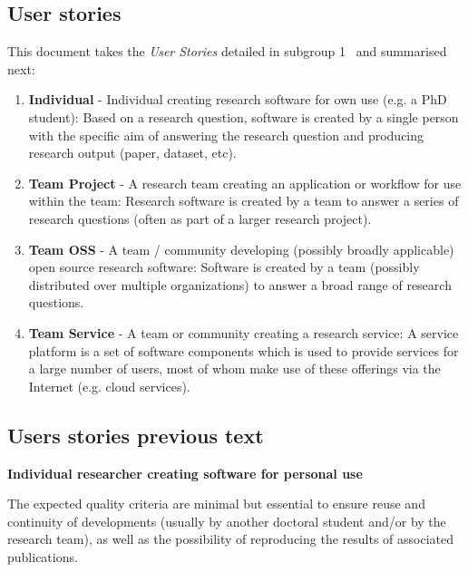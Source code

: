 \subsection{User stories}
\label{subsec:user_stories}

This document takes the \textit{User Stories} detailed in subgroup 1~\cite{sg1tf2023} and summarised next:

\begin{enumerate}
    \item \textbf{Individual} - Individual creating research software for own use (e.g. a PhD student): Based on a research question, software is created by a single person with the specific aim of answering the research question and producing research output (paper, dataset, etc).
    \item \textbf{Team Project} - A research team creating an application or workflow for use within the team: Research software is created by a team to answer a series of research questions (often as part of a larger research project).
    \item \textbf{Team OSS} - A team / community developing (possibly broadly applicable) open source research software: Software is created by a team (possibly distributed over multiple organizations) to answer a broad range of research questions.
    \item \textbf{Team Service} - A team or community creating a research service: A service platform is a set of software components which is used to provide services for a large number of users, most of whom make use of these offerings via the Internet (e.g. cloud services).
\end{enumerate}




\subsection{Users stories previous text}


\textbf{Individual researcher creating software for personal use} 

The expected quality criteria are minimal but essential to ensure
reuse and continuity of developments (usually by another doctoral
student and/or by the research team), as well as the possibility of
reproducing the results of associated publications. 

